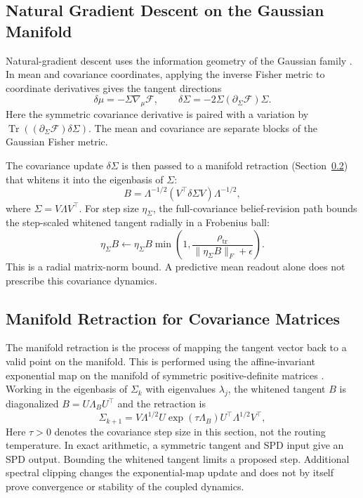 \documentclass[twoside,11pt]{article}
\begin{document}
\subsection{Natural Gradient Descent on the Gaussian Manifold}
Natural-gradient descent uses the information geometry of the Gaussian family \citep{amari1998natural,Cencov1982,Amari2016}. In mean and covariance coordinates, applying the inverse Fisher metric to coordinate derivatives gives the tangent directions
\begin{equation}
\delta\mu=-\Sigma\nabla_\mu\mathcal F,\qquad
\delta\Sigma=-2\Sigma(\partial_\Sigma\mathcal F)\Sigma.
\label{eq:gaussian_fisher_tangents}
\end{equation}
Here the symmetric covariance derivative is paired with a variation by
\(\operatorname{Tr}((\partial_\Sigma\mathcal F)\delta\Sigma)\). The mean and covariance are separate blocks of the Gaussian Fisher metric.


The covariance update $\delta\Sigma$ is then passed to a manifold retraction (Section~\ref{sec:retraction}) that whitens it into the eigenbasis of $\Sigma$:
\begin{equation}
B = \Lambda^{-1/2} (V^\top \delta\Sigma V) \Lambda^{-1/2},
\end{equation}
where $\Sigma=V\Lambda V^\top$. For step size $\eta_\Sigma$, the full-covariance belief-revision path bounds the step-scaled whitened tangent radially in a Frobenius ball:
\begin{equation}
\eta_\Sigma B\leftarrow
\eta_\Sigma B\min\left(1,\frac{\rho_{\mathrm{tr}}}
{\|\eta_\Sigma B\|_F+\epsilon}\right).
\end{equation}
This is a radial matrix-norm bound. A predictive mean readout alone does not prescribe this covariance dynamics.

\subsection{Manifold Retraction for Covariance Matrices}\label{sec:retraction}
The manifold retraction is the process of mapping the tangent vector back to a valid point on the manifold. This is performed using the affine-invariant exponential map on the manifold of symmetric positive-definite matrices \citep{Pennec2006,Bhatia2007,Absil2008}. Working in the eigenbasis of $\Sigma_k$ with eigenvalues $\lambda_j$, the whitened tangent $B$ is diagonalized $B = U\Lambda_B U^\top$ and the retraction is
\begin{equation}
\Sigma_{k+1} = V \Lambda^{1/2} U \exp(\tau \Lambda_B) U^\top \Lambda^{1/2} V^\top,
\end{equation}
Here $\tau>0$ denotes the covariance step size in this section, not the routing temperature. In exact arithmetic, a symmetric tangent and SPD input give an SPD output. Bounding the whitened tangent limits a proposed step. Additional spectral clipping changes the exponential-map update and does not by itself prove convergence or stability of the coupled dynamics.
\end{document}
